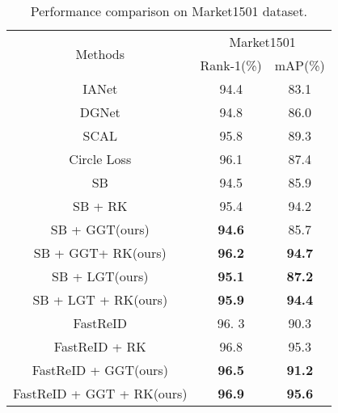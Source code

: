 \documentclass[10pt,twocolumn,letterpaper]{article}
\begin{document}
\begin{table}[]
\centering 
	\setlength\tabcolsep{3pt}\caption{Performance comparison on Market1501 dataset.}
	\begin{tabular}{ccc}
		\hline
		\multirow{2}{*}{Methods}         & \multicolumn{2}{c}{Market1501}            \\ \cline{2-3} 
		& Rank-1(\%)          & mAP(\%)             \\ \hline
		IANet\cite{IANet}             & 94.4                & 83.1                \\ 
		DGNet\cite{zheng2019joint}           & 94.8                & 86.0                \\ 
		SCAL\cite{SCAL}             & 95.8                & 89.3                \\ 
		Circle Loss\cite{Circle}    & 96.1                & 87.4                \\ 
		SB\cite{stong_baseline} & 94.5                & 85.9                \\ \hline
		SB\cite{stong_baseline} + RK\cite{re_ranking}                & 95.4                & 94.2                \\ 
		SB + GGT(ours)             & \textbf{94.6} & 85.7                \\ 
		SB + GGT+ RK(ours)     & \textbf{96.2} & \textbf{94.7} \\ 
		SB + LGT(ours)             & \textbf{95.1} & \textbf{87.2} \\ 
		SB + LGT + RK(ours)    & \textbf{95.9} & \textbf{94.4} \\ \hline
		FastReID\cite{FastReID}       & 96. 3               & 90.3                \\ 
		FastReID + RK                & 96.8                & 95.3                \\ 
		FastReID + GGT(ours)             & \textbf{96.5} & \textbf{91.2} \\ 
		FastReID + GGT + RK(ours)    & \textbf{96.9} & \textbf{95.6} \\ \hline
	\end{tabular}
\end{table}
\end{document}
